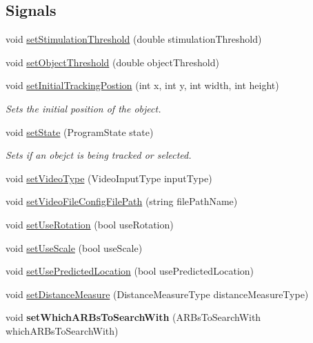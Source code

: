 \subsection*{Signals}
\begin{DoxyCompactItemize}
\item 
void \hyperlink{class_qt_widget_image_display_ae8d9428c993c2963636527fe6a5de437}{set\+Stimulation\+Threshold} (double stimulation\+Threshold)
\item 
void \hyperlink{class_qt_widget_image_display_a2458d0c43ad30f76425378d1af12c28c}{set\+Object\+Threshold} (double object\+Threshold)
\item 
void \hyperlink{class_qt_widget_image_display_aa45cd7ccb44eed2ffe8906bb638bbff8}{set\+Initial\+Tracking\+Postion} (int x, int y, int width, int height)
\begin{DoxyCompactList}\small\item\em Sets the initial position of the object. \end{DoxyCompactList}\item 
void \hyperlink{class_qt_widget_image_display_a4a319442190375dc4c6292cfdf0eb5d5}{set\+State} (Program\+State state)
\begin{DoxyCompactList}\small\item\em Sets if an obejct is being tracked or selected. \end{DoxyCompactList}\item 
void \hyperlink{class_qt_widget_image_display_a40b886057dfcebf207c50deb7a01ad76}{set\+Video\+Type} (Video\+Input\+Type input\+Type)
\item 
void \hyperlink{class_qt_widget_image_display_a7c6789b7f9e7abfa3fb514084fd45811}{set\+Video\+File\+Config\+File\+Path} (string file\+Path\+Name)
\item 
void \hyperlink{class_qt_widget_image_display_aad205e732e07afc1928cb4a4a58c5b97}{set\+Use\+Rotation} (bool use\+Rotation)
\item 
void \hyperlink{class_qt_widget_image_display_a2dabda43142dffe1416d3296087b2a3f}{set\+Use\+Scale} (bool use\+Scale)
\item 
void \hyperlink{class_qt_widget_image_display_a0eea72b2c4ce840d49e9d46502ae81b0}{set\+Use\+Predicted\+Location} (bool use\+Predicted\+Location)
\item 
void \hyperlink{class_qt_widget_image_display_ae99fa698ae5da37da20cd94192a7b0db}{set\+Distance\+Measure} (Distance\+Measure\+Type distance\+Measure\+Type)
\item 
\hypertarget{class_qt_widget_image_display_a6adb17100e4abae17a7e9074b7531e8e}{}void {\bfseries set\+Which\+A\+R\+Bs\+To\+Search\+With} (A\+R\+Bs\+To\+Search\+With which\+A\+R\+Bs\+To\+Search\+With)\label{class_qt_widget_image_display_a6adb17100e4abae17a7e9074b7531e8e}


\end{DoxyCompactItemize}
